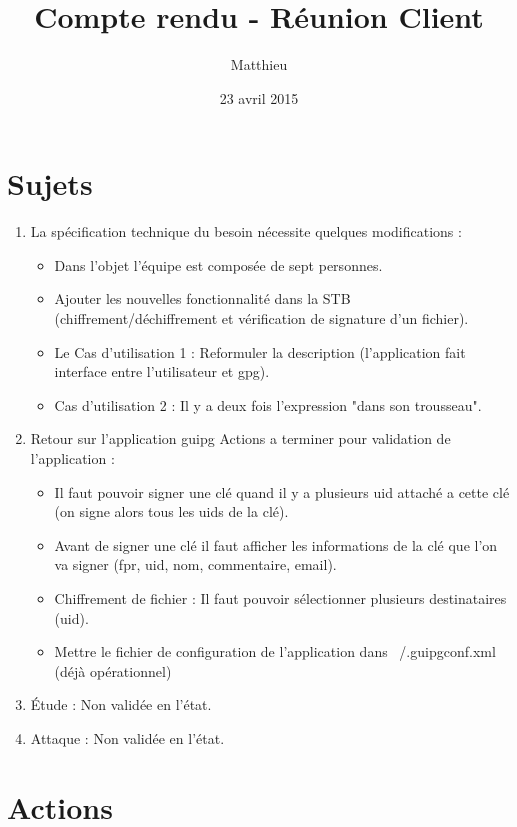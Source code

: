\documentclass{CR-projet}
\title{Compte rendu - Réunion Client}
\author{Matthieu \bsc{FIN}}
\date{23 avril 2015}
\begin{document}
\maketitle
\newpage

\newpage

\section{Sujets}

\begin{enumerate}
	\item La spécification technique du besoin nécessite quelques modifications :
	\begin{itemize}
		\item Dans l'objet l'équipe est composée de sept personnes.
		\item Ajouter les nouvelles fonctionnalité dans la STB (chiffrement/déchiffrement et vérification de signature d'un fichier).
		\item Le Cas d'utilisation 1 : Reformuler la description (l'application fait interface entre l'utilisateur et gpg).
		\item Cas d'utilisation 2 : Il y a deux fois l'expression "dans son trousseau".
	\end{itemize}
	\item Retour sur l'application guipg Actions a terminer pour validation de l'application :
	\begin{itemize}
		\item Il faut pouvoir signer une clé quand il y a plusieurs uid attaché a cette clé (on signe alors tous les uids de la clé).
		\item Avant de signer une clé il faut afficher les informations de la clé que l'on va signer (fpr, uid, nom, commentaire, email). 
		\item Chiffrement de fichier : Il faut pouvoir sélectionner plusieurs destinataires (uid).
		\item Mettre le fichier de configuration de l'application dans ~/.guipgconf.xml (déjà opérationnel)
	\end{itemize}
	\item Étude : Non validée en l'état.
	\item Attaque : Non validée en l'état.
\end{enumerate}

\section{Actions}
\end{document}
